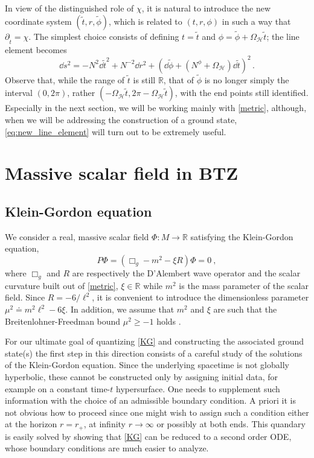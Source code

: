 \documentclass[aps, prd, amsmath, floats, floatfix, twocolumn, nofootinbib, superscriptaddress, showpacs]{revtex4-1}
\def\bR{{\mathbb R}}
\def\H{\mathcal{H}}
\begin{document}
In view of the distinguished role of $\chi$, it is natural to introduce the new coordinate system $(\tilde{t},r,\tilde{\phi})$, which is related to $(t,r,\phi)$ in such a way that $\partial_{\tilde{t}}=\chi$. The simplest choice consists of defining $t=\widetilde{t}$ and $\phi=\tilde{\phi}+\Omega_{\mathcal{H}}\tilde{t}$; the line element becomes
%
\begin{equation}\label{eq:new_line_element}
\dd s^2 = -N^2 \dd\tilde{t}^2 + N^{-2} \dd r^2 + \left(\dd\tilde{\phi}+(N^\phi+\Omega_{\mathcal{H}})\dd\tilde{t}\right)^2 \, .
\end{equation}
%
Observe that, while the range of $\tilde{t}$ is still $\bR$, that of $\tilde{\phi}$ is no longer simply the interval $(0,2\pi)$, rather $(-\Omega_\H \tilde{t}, 2\pi -\Omega_\H \tilde{t})$, with the end points still identified. Especially in the next section, we will be working mainly with \eqref{metric}, although, when we will be addressing the construction of a ground state, \eqref{eq:new_line_element} will turn out to be extremely useful.





\section{Massive scalar field in BTZ}
\label{sec:KGeq}


\subsection{Klein-Gordon equation}
	
We consider a real, massive scalar field $\Phi: M\to\bR$ satisfying the Klein-Gordon equation,
	\begin{equation}\label{KG}
	P\Phi = (\Box_g - m^2-\xi R)\Phi =0\ ,
	\end{equation}
	where $\Box_g$ and $R$ are respectively the D'Alembert wave operator and the scalar curvature built out of \eqref{metric}, $\xi\in\bR$ while $m^2$ is the mass parameter of the scalar field. Since $R=-6/\ell^2$, it is convenient to introduce the dimensionless parameter $\mu^2 \doteq m^2 \ell^2-6\xi$. In addition, we assume that $m^2$ and $\xi$ are such that the Breitenlohner-Freedman bound $\mu^2 \geqslant -1$ holds \cite{Breitenlohner:1982jf}. 
	
	For our ultimate goal of quantizing \eqref{KG} and constructing the associated ground state(s) the first step in this direction consists of a careful study of the solutions of the Klein-Gordon equation. 
	Since the underlying spacetime is not globally hyperbolic, these cannot be constructed only by assigning initial data, for example on a constant time-$t$ hypersurface. One needs to supplement such information with the choice of an admissible boundary condition. A priori it is not obvious how to proceed since one might wish to assign such a condition either at the horizon $r=r_+$, at infinity $r\to\infty$ or possibly at both ends. This quandary is easily solved by showing that \eqref{KG} can be reduced to a second order ODE, whose boundary conditions are much easier to analyze. 
	
\end{document}
